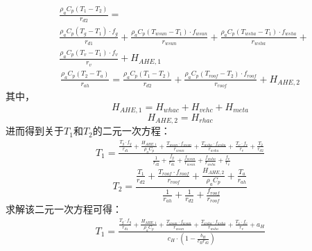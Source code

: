 \begin{equation}
    \begin{split}
        & \frac{\rho _a C_p \left( T_{1} - T_{2} \right)}{r_{d2}} = \\
        & \frac{\rho _a C_p \left( T_{g} - T_{1} \right) \cdot f_{g}}{r_{d1}} + \frac{\rho _a C_p \left( T_{wsun} - T_{1} \right) \cdot f_{wsun}}{r_{wsun}} + \frac{\rho _a C_p \left( T_{wsha} - T_{1} \right) \cdot f_{wsha}}{r_{wsha}} + 
        \\ 
        & \frac{\rho _a C_p \left( T_{v} - T_{1} \right) \cdot f_v}{r_{v}} + H_{AHE,1}
    \end{split}
\end{equation}
%
\begin{equation}
    \begin{split}
        \frac{\rho _a C_p \left( T_{2} - T_a \right)}{r_{ah}} = 
        \frac{\rho _a C_p \left( T_{1} - T_{2} \right)}{r_{d2}} + \frac{\rho _a C_p \left( T_{roof} - T_{2} \right)\cdot f_{roof}}{r_{roof}} + H_{AHE,2}
    \end{split}
\end{equation}
其中，
\begin{equation}
    H_{AHE,1} = H_{whac} + H_{vehc} + H_{meta} 
\end{equation}
%
\begin{equation}
    H_{AHE,2} = H_{rhac}
\end{equation}
进而得到关于$T_{1}$和$T_{2}$的二元一次方程：
\begin{equation}
    \begin{split}
         T_{1} =
         \frac{\frac{T_{g} \cdot f_{g}}{r_{d1}} + \frac{H_{AHE,1}}{\rho _a C_p} + \frac{T_{wsun} \cdot f_{wsun}}{r_{wsun}} + \frac{T_{wsha} \cdot f_{wsha}}{r_{wsha}} + \frac{T_{v} \cdot f_v}{r_{v}} + \frac{T_{2}}{r_{d2}}}{\frac{1}{r_{d2}} + \frac{f_{g}}{r_{d1}} + \frac{f_{wsun}}{r_{wsun}} + \frac{f_{wsha}}{r_{wsha}} + \frac{f_v}{r_{v}}}
    \end{split}
\end{equation}
%
\begin{equation}\label{result_T_layer2}
    T_{2} = \frac{\frac{T_{1}}{r_{d2}} + \frac{T_{roof} \cdot f_{roof}}{r_{roof}} + \frac{H_{AHE,2}}{\rho _a C_p} + \frac{T_a}{r_{ah}}}{\frac{1}{r_{ah}} + \frac{1}{r_{d2}} + \frac{f_{roof}}{r_{roof}}}
\end{equation}
求解该二元一次方程可得：
\begin{equation}
    \begin{split}
         T_{1} = 
         \frac{\frac{T_{g} \cdot f_{g}}{r_{d1}} + \frac{H_{AHE,1}}{\rho _a C_p} + \frac{T_{wsun} \cdot f_{wsun}}{r_{wsun}} + \frac{T_{wsha} \cdot f_{wsha}}{r_{wsha}} + \frac{T_{v} \cdot f_{v}}{r_{v}} + a_{H}}{c_{H} \cdot \left( 1 - \frac{b_H}{c_{H} r_{d2}} \right)}
    \end{split}
\end{equation}
